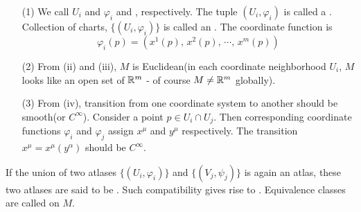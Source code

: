 \documentclass[a4paper, 10pt]{article}
\begin{document}
\begin{remark}
    \hphantom{.}
    \begin{itemize}
        \item[(1)] We call $U_{i}$ and $\varphi_{i}$  and , respectively. The tuple $(U_{i}, \varphi_{i})$ is called a . Collection of charts, $\{ (U_{i}, \varphi_{i}) \}$ is called an . The coordinate function is
        \[ \varphi_{i}(p) = (x^{1}(p),\, x^{2}(p),\, \cdots,\, x^{m}(p))  \]
        \item[(2)] From (ii) and (iii), $M$ is  Euclidean(in each coordinate neighborhood $U_{i}$, $M$ looks like an open set of $\mathbb{R}^{m}$ - of course $M \neq \mathbb{R}^{m}$ globally).
        \item[(3)] From (iv), transition from one coordinate system to another should be smooth(or $C^{\infty}$). Consider a point $p \in U_{i} \cap U_{j}$. Then corresponding coordinate functions $\varphi_{i}$ and $\varphi_{j}$ assign $x^{\mu}$ and $y^{\mu}$ respectively. The transition $x^{\mu} = x^{\mu}(y^{\alpha})$ should be $C^{\infty}$.
    \end{itemize}
\end{remark}

\begin{remark}
    If the union of two atlases $\{ (U_{i}, \varphi_{i}) \}$ and $\{ (V_{j}, \psi_{j}) \}$ is again an atlas, these two atlases are said to be . Such compatibility gives rise to . Equivalence classes are called  on $M$.
\end{remark}
\newpage

\end{document}
